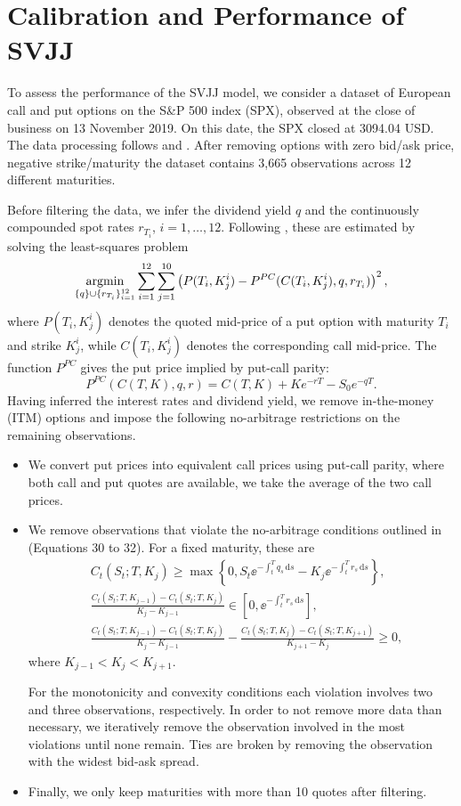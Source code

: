 \chapter{Calibration and Performance of SVJJ}
\label{ch:calibration}
To assess the performance of the SVJJ model, we consider a dataset of European call and put options
on the S\&P 500 index (SPX), observed at the close of business on 13 November 2019. On this date,
the SPX closed at 3094.04 USD. The data processing follows \parencite{FEdatahandling} and
\parencite{Kokholm2016}. After removing options with zero bid/ask price, negative strike/maturity
the dataset contains 3,665 observations across 12 different maturities.

Before filtering the data, we infer the dividend yield $q$ and the continuously compounded spot
rates $r_{T_i}$, $i=1,\ldots,12$. Following \parencite{FEdatahandling}, these are estimated by
solving the least-squares problem
\[
  \underset{\{ q \}\cup \{r_{T_i}\}_{i=1}^{12}}{\operatorname{argmin}}
\sum_{i=1}^{12}\sum_{j=1}^{10}
\left(
P(T_i,K_j^i)
-
P^{PC}(C(T_i,K_j^i),q,r_{T_i})
\right)^2,
\]
where $P(T_i,K_j^i)$ denotes the quoted mid-price of a put option with maturity $T_i$ and strike
$K_j^i$, while $C(T_i,K_j^i)$ denotes the corresponding call mid-price. The function $P^{PC}$
gives the put price implied by put-call parity:
\[
P^{PC}(C(T,K),q,r)
=
C(T,K)+Ke^{-rT}-S_0e^{-qT}.
\]
Having inferred the interest rates and dividend yield, we remove in-the-money (ITM) options and
impose the following no-arbitrage restrictions on the remaining observations.
\begin{itemize}
\item We convert put prices into equivalent call prices using put-call parity, where both call and
  put quotes are available, we take the average of the two call prices.
\item We remove observations that violate the no-arbitrage conditions outlined in
  \parencite{Kokholm2016} (Equations 30 to 32). For a fixed maturity, these are
\begin{align*}
&C_t(S_t;T,K_j)
\geq
\max\left\{
0,
S_t \ee^{-\int_t^T q_s\,\mathrm{d}s}
-
K_j \ee^{-\int_t^T r_s\,\mathrm{d}s}
\right\}
\tag{Price bounds},\\
&\frac{C_t(S_t;T,K_{j-1})-C_t(S_t;T,K_j)}
{K_j-K_{j-1}}
\in
\left[0,\ee^{-\int_t^T r_s\,\mathrm{d}s}\right]
\tag{Monotonicity},\\
&\frac{C_t(S_t;T,K_{j-1})-C_t(S_t;T,K_j)}
{K_j-K_{j-1}}
-
\frac{C_t(S_t;T,K_j)-C_t(S_t;T,K_{j+1})}
{K_{j+1}-K_j}
\geq 0
\tag{Convexity},
\end{align*}
where $K_{j-1}<K_j<K_{j+1}$.

For the monotonicity and convexity conditions each violation involves two and three observations,
respectively. In order to not remove more data than necessary, we iteratively remove the observation
involved in the most violations until none remain. Ties are broken by removing the observation with
the widest bid-ask spread.

\item Finally, we only keep maturities with more than 10 quotes after filtering.
\end{itemize}

